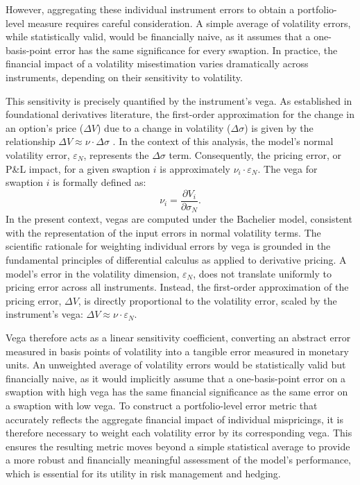 However, aggregating these individual instrument errors to obtain a portfolio-level measure requires careful consideration. A simple average of volatility errors, while statistically valid, would be financially naive, as it assumes that a one-basis-point error has the same significance for every swaption. In practice, the financial impact of a volatility misestimation varies dramatically across instruments, depending on their sensitivity to volatility.

This sensitivity is precisely quantified by the instrument's vega. As established in foundational derivatives literature, the first-order approximation for the change in an option's price (\(\Delta V\)) due to a change in volatility (\(\Delta \sigma\)) is given by the relationship \( \Delta V \approx \nu \cdot \Delta \sigma \) \parencite[pp.~415-417]{hull2015optionsfutures}. In the context of this analysis, the model's normal volatility error, \( \varepsilon_N \), represents the \( \Delta \sigma \) term. Consequently, the pricing error, or P\&L impact, for a given swaption \( i \) is approximately \( \nu_i \cdot \varepsilon_N \). The vega for swaption \( i \) is formally defined as:
\begin{equation}
	\nu_i = \frac{\partial V_i}{\partial \sigma_N}.
\end{equation}
In the present context, vegas are computed under the Bachelier model, consistent with the representation of the input errors in normal volatility terms. The scientific rationale for weighting individual errors by vega is grounded in the fundamental principles of differential calculus as applied to derivative pricing. A model's error in the volatility dimension, \(\varepsilon_N\), does not translate uniformly to pricing error across all instruments. Instead, the first-order approximation of the pricing error, \(\Delta V\), is directly proportional to the volatility error, scaled by the instrument's vega: \( \Delta V \approx \nu \cdot \varepsilon_N \).

Vega therefore acts as a linear sensitivity coefficient, converting an abstract error measured in basis points of volatility into a tangible error measured in monetary units. An unweighted average of volatility errors would be statistically valid but financially naive, as it would implicitly assume that a one-basis-point error on a swaption with high vega has the same financial significance as the same error on a swaption with low vega. To construct a portfolio-level error metric that accurately reflects the aggregate financial impact of individual mispricings, it is therefore necessary to weight each volatility error by its corresponding vega. This ensures the resulting metric moves beyond a simple statistical average to provide a more robust and financially meaningful assessment of the model's performance, which is essential for its utility in risk management and hedging.

